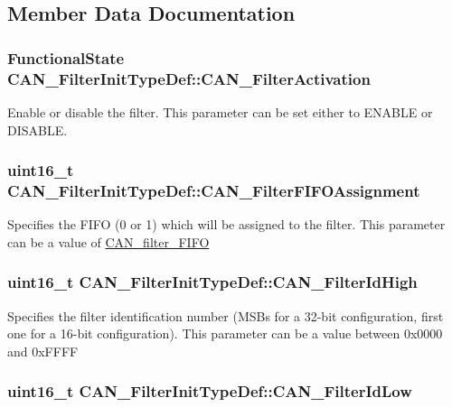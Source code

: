 \subsection{Member Data Documentation}
\hypertarget{structCAN__FilterInitTypeDef_a0225afda33b565f358ca75bdaa780074}{
\subsubsection[{CAN\_\-FilterActivation}]{\setlength{\rightskip}{0pt plus 5cm}FunctionalState {\bf CAN\_\-FilterInitTypeDef::CAN\_\-FilterActivation}}}
\label{structCAN__FilterInitTypeDef_a0225afda33b565f358ca75bdaa780074}
Enable or disable the filter. This parameter can be set either to ENABLE or DISABLE. \hypertarget{structCAN__FilterInitTypeDef_a01ba491f12097adcc9f0a3d627628d55}{
\subsubsection[{CAN\_\-FilterFIFOAssignment}]{\setlength{\rightskip}{0pt plus 5cm}uint16\_\-t {\bf CAN\_\-FilterInitTypeDef::CAN\_\-FilterFIFOAssignment}}}
\label{structCAN__FilterInitTypeDef_a01ba491f12097adcc9f0a3d627628d55}
Specifies the FIFO (0 or 1) which will be assigned to the filter. This parameter can be a value of \hyperlink{group__CAN__filter__FIFO}{CAN\_\-filter\_\-FIFO} \hypertarget{structCAN__FilterInitTypeDef_afc109aa8eedced09d296605f2eb871f7}{
\subsubsection[{CAN\_\-FilterIdHigh}]{\setlength{\rightskip}{0pt plus 5cm}uint16\_\-t {\bf CAN\_\-FilterInitTypeDef::CAN\_\-FilterIdHigh}}}
\label{structCAN__FilterInitTypeDef_afc109aa8eedced09d296605f2eb871f7}
Specifies the filter identification number (MSBs for a 32-\/bit configuration, first one for a 16-\/bit configuration). This parameter can be a value between 0x0000 and 0xFFFF \hypertarget{structCAN__FilterInitTypeDef_ab8c56b48ac323e8c7a1b535c79a51f87}{
\subsubsection[{CAN\_\-FilterIdLow}]{\setlength{\rightskip}{0pt plus 5cm}uint16\_\-t {\bf CAN\_\-FilterInitTypeDef::CAN\_\-FilterIdLow}}}
